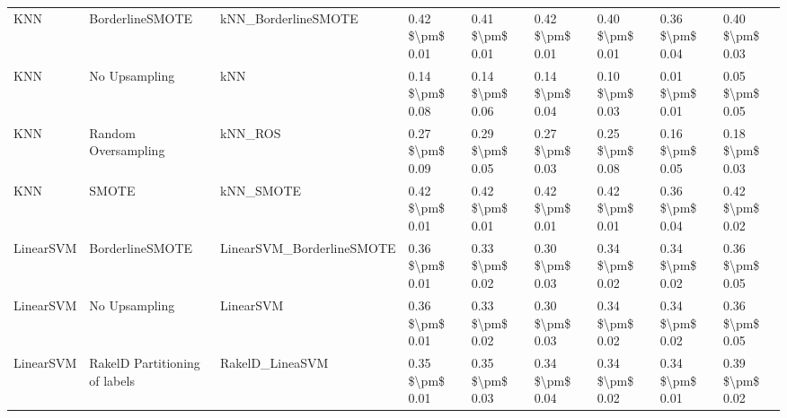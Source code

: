 \begin{tabular}{lllllllll}
                            KNN &               BorderlineSMOTE &                          kNN\_BorderlineSMOTE & 0.42 \$\textbackslash pm\$ 0.01 &           0.41 \$\textbackslash pm\$ 0.01 &       0.42 \$\textbackslash pm\$ 0.01 &        0.40 \$\textbackslash pm\$ 0.01 &                         0.36 \$\textbackslash pm\$ 0.04 &     0.40 \$\textbackslash pm\$ 0.03 \\
                            KNN &                 No Upsampling &                                          kNN & 0.14 \$\textbackslash pm\$ 0.08 &           0.14 \$\textbackslash pm\$ 0.06 &       0.14 \$\textbackslash pm\$ 0.04 &        0.10 \$\textbackslash pm\$ 0.03 &                         0.01 \$\textbackslash pm\$ 0.01 &     0.05 \$\textbackslash pm\$ 0.05 \\
                            KNN &           Random Oversampling &                                      kNN\_ROS & 0.27 \$\textbackslash pm\$ 0.09 &           0.29 \$\textbackslash pm\$ 0.05 &       0.27 \$\textbackslash pm\$ 0.03 &        0.25 \$\textbackslash pm\$ 0.08 &                         0.16 \$\textbackslash pm\$ 0.05 &     0.18 \$\textbackslash pm\$ 0.03 \\
                            KNN &                         SMOTE &                                    kNN\_SMOTE & 0.42 \$\textbackslash pm\$ 0.01 &           0.42 \$\textbackslash pm\$ 0.01 &       0.42 \$\textbackslash pm\$ 0.01 &        0.42 \$\textbackslash pm\$ 0.01 &                         0.36 \$\textbackslash pm\$ 0.04 &     0.42 \$\textbackslash pm\$ 0.02 \\
                      LinearSVM &               BorderlineSMOTE &                    LinearSVM\_BorderlineSMOTE & 0.36 \$\textbackslash pm\$ 0.01 &           0.33 \$\textbackslash pm\$ 0.02 &       0.30 \$\textbackslash pm\$ 0.03 &        0.34 \$\textbackslash pm\$ 0.02 &                         0.34 \$\textbackslash pm\$ 0.02 &     0.36 \$\textbackslash pm\$ 0.05 \\
                      LinearSVM &                 No Upsampling &                                    LinearSVM & 0.36 \$\textbackslash pm\$ 0.01 &           0.33 \$\textbackslash pm\$ 0.02 &       0.30 \$\textbackslash pm\$ 0.03 &        0.34 \$\textbackslash pm\$ 0.02 &                         0.34 \$\textbackslash pm\$ 0.02 &     0.36 \$\textbackslash pm\$ 0.05 \\
                      LinearSVM & RakelD Partitioning of labels &                              RakelD\_LineaSVM & 0.35 \$\textbackslash pm\$ 0.01 &           0.35 \$\textbackslash pm\$ 0.03 &       0.34 \$\textbackslash pm\$ 0.04 &        0.34 \$\textbackslash pm\$ 0.02 &                         0.34 \$\textbackslash pm\$ 0.01 &     0.39 \$\textbackslash pm\$ 0.02 \\

\end{tabular}
